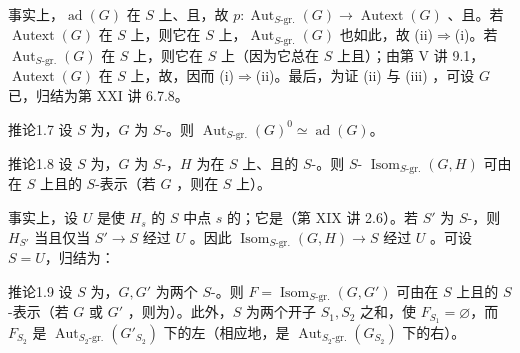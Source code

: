 事实上，$\operatorname{ad}(G)$ 在 $S$ 上、且，故 $p:\operatorname{Aut}_{S\text{-gr.}}(G)\to\operatorname{Autext}(G)$ 、且。若 $\operatorname{Autext}(G)$ 在 $S$ 上，则它在 $S$ 上，$\operatorname{Aut}_{S\text{-gr.}}(G)$ 也如此，故 (ii)$\Rightarrow$(i)。若 $\operatorname{Aut}_{S\text{-gr.}}(G)$ 在 $S$ 上，则它在 $S$ 上（因为它总在 $S$ 上且）；由第 V 讲 9.1，$\operatorname{Autext}(G)$ 在 $S$ 上，故，因而 (i)$\Rightarrow$(ii)。最后，为证 (ii) 与 (iii) ，可设 $G$ 已，归结为第 XXI 讲 6.7.8。
\begin{SGAresult}{推论}{1.7}
设 $S$ 为，$G$ 为 $S$-。则 $\operatorname{Aut}_{S\text{-gr.}}(G)^0\simeq\operatorname{ad}(G)$。
\end{SGAresult}
\begin{SGAresult}{推论}{1.8}
设 $S$ 为，$G$ 为 $S$-，$H$ 为在 $S$ 上、且的 $S$-。则 $S$- $\operatorname{Isom}_{S\text{-gr.}}(G,H)$ 可由在 $S$ 上且的 $S$-表示（若 $G$ ，则在 $S$ 上）。
\end{SGAresult}
事实上，设 $U$ 是使 $H_s$ 的 $S$ 中点 $s$ 的；它是（第 XIX 讲 2.6）。若 $S'$ 为 $S$-，则 $H_{S'}$ 当且仅当 $S'\to S$ 经过 $U$ 。因此 $\operatorname{Isom}_{S\text{-gr.}}(G,H)\to S$ 经过 $U$ 。可设 $S=U$，归结为：
\begin{SGAresult}{推论}{1.9}
设 $S$ 为，$G,G'$ 为两个 $S$-。则 $F=\operatorname{Isom}_{S\text{-gr.}}(G,G')$ 可由在 $S$ 上且的 $S$-表示（若 $G$ 或 $G'$ ，则为）。此外，$S$ 为两个开子 $S_1,S_2$ 之和，使 $F_{S_1}=\varnothing$，而 $F_{S_2}$ 是 $\operatorname{Aut}_{S_2\text{-gr.}}(G'_{S_2})$ 下的左（相应地，是 $\operatorname{Aut}_{S_2\text{-gr.}}(G_{S_2})$ 下的右）。
\end{SGAresult}

